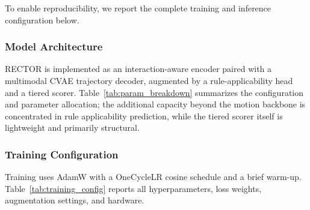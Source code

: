 To enable reproducibility, we report the complete training and inference configuration below.

\subsubsection{Model Architecture}

RECTOR is implemented as an interaction-aware encoder paired with a multimodal CVAE trajectory decoder, augmented by a rule-applicability head and a tiered scorer.  Table~\ref{tab:param_breakdown} summarizes the configuration and parameter allocation; the additional capacity beyond the motion backbone is concentrated in rule applicability prediction, while the tiered scorer itself is lightweight and primarily structural. 
\subsubsection{Training Configuration}

Training uses AdamW with a OneCycleLR cosine schedule and a brief warm-up. Table~\ref{tab:training_config} reports all hyperparameters, loss weights, augmentation settings, and hardware.

